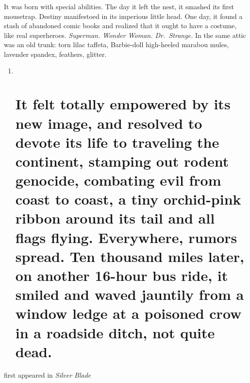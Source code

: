 It was born with special abilities. The day it left the nest, it smashed
its first mousetrap. Destiny manifestoed in its imperious little head.
One day, it found a stash of abandoned comic books and realized that it
ought to have a costume, like real superheroes. \emph{Superman. Wonder
Woman. Dr.~Strange.} In the same attic was an old trunk: torn lilac
taffeta, Barbie-doll high-heeled marabou mules, lavender spandex,
feathers, glitter.

\begin{enumerate}
\def\labelenumi{\arabic{enumi}.}
\item ~
  \hypertarget{it-felt-totally-empowered-by-its-new-image-and-resolved-to-devote-its-life-to-traveling-the-continent-stamping-out-rodent-genocide-combating-evil-from-coast-to-coast-a-tiny-orchid-pink-ribbon-around-its-tail-and-all-flags-flying.-everywhere-rumors-spread.-ten-thousand-miles-later-on-another-16-hour-bus-ride-it-smiled-and-waved-jauntily-from-a-window-ledge-at-a-poisoned-crow-in-a-roadside-ditch-not-quite-dead.}{%
  \section{It felt totally empowered by its new image, and resolved to
  devote its life to traveling the continent, stamping out rodent
  genocide, combating evil from coast to coast, a tiny orchid-pink
  ribbon around its tail and all flags flying. Everywhere, rumors
  spread. Ten thousand miles later, on another 16-hour bus ride, it
  smiled and waved jauntily from a window ledge at a poisoned crow in a
  roadside ditch, not quite
  dead.}\label{it-felt-totally-empowered-by-its-new-image-and-resolved-to-devote-its-life-to-traveling-the-continent-stamping-out-rodent-genocide-combating-evil-from-coast-to-coast-a-tiny-orchid-pink-ribbon-around-its-tail-and-all-flags-flying.-everywhere-rumors-spread.-ten-thousand-miles-later-on-another-16-hour-bus-ride-it-smiled-and-waved-jauntily-from-a-window-ledge-at-a-poisoned-crow-in-a-roadside-ditch-not-quite-dead.}}
\end{enumerate}

first appeared in \emph{Silver Blade}
